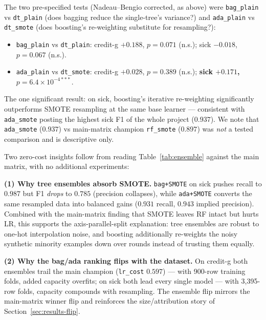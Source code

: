 The two pre-specified tests (Nadeau--Bengio corrected, as above) were \texttt{bag\_plain} vs \texttt{dt\_plain} (does bagging reduce the single-tree's variance?) and \texttt{ada\_plain} vs \texttt{dt\_smote} (does boosting's re-weighting substitute for resampling?):

\begin{itemize}
  \item \texttt{bag\_plain} vs \texttt{dt\_plain}: credit-g $+0.188$, $p=0.071$ (n.s.); sick $-0.018$, $p=0.067$ (n.s.).
  \item \texttt{ada\_plain} vs \texttt{dt\_smote}: credit-g $+0.028$, $p=0.389$ (n.s.); \textbf{sick $+0.171$, $p=6.4\times10^{-4***}$}.
\end{itemize}

The one significant result: on sick, boosting's iterative re-weighting significantly outperforms SMOTE resampling at the same base learner --- consistent with \texttt{ada\_smote} posting the highest sick F1 of the whole project ($0.937$). We note that \texttt{ada\_smote} ($0.937$) vs main-matrix champion \texttt{rf\_smote} ($0.897$) was \emph{not} a tested comparison and is descriptive only.

Two zero-cost insights follow from reading Table~\ref{tab:ensemble} against the main matrix, with no additional experiments:

\textbf{(1) Why tree ensembles absorb SMOTE.} \texttt{bag+SMOTE} on sick pushes recall to $0.987$ but F1 \emph{drops} to $0.785$ (precision collapses), while \texttt{ada+SMOTE} converts the same resampled data into balanced gains ($0.931$ recall, $0.943$ implied precision). Combined with the main-matrix finding that SMOTE leaves RF intact but hurts LR, this supports the axis-parallel-split explanation: tree ensembles are robust to one-hot interpolation noise, and boosting additionally re-weights the noisy synthetic minority examples down over rounds instead of trusting them equally.

\textbf{(2) Why the bag/ada ranking flips with the dataset.} On credit-g both ensembles trail the main champion (\texttt{lr\_cost} $0.597$) --- with 900-row training folds, added capacity overfits; on sick both lead every single model --- with 3{,}395-row folds, capacity compounds with resampling. The ensemble flip mirrors the main-matrix winner flip and reinforces the size/attribution story of Section~\ref{sec:results-flip}.

